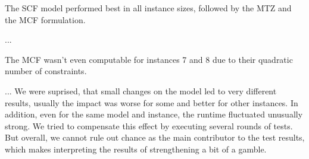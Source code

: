 \documentclass[,%
			paper=a4,%
			DIV14,
			liststotoc,
			bibtotoc,
			draft=false,%
			numbers=noendperiod
			]{scrartcl}
\begin{document}
The SCF model performed best in all instance sizes, followed by the MTZ and the MCF formulation.

...

The MCF wasn't even computable for instances 7 and 8 due to their quadratic number of constraints.

...
We were suprised, that small changes on the model led to very different results, usually the impact was worse for some and better for other instances. In addition, even for the same model and instance, the runtime fluctuated unusually strong. We tried to compensate this effect by executing several rounds of tests. But overall, we cannot rule out chance as the main contributor to the test results, which makes interpreting the results of strengthening a bit of a gamble.

 
\end{document}
